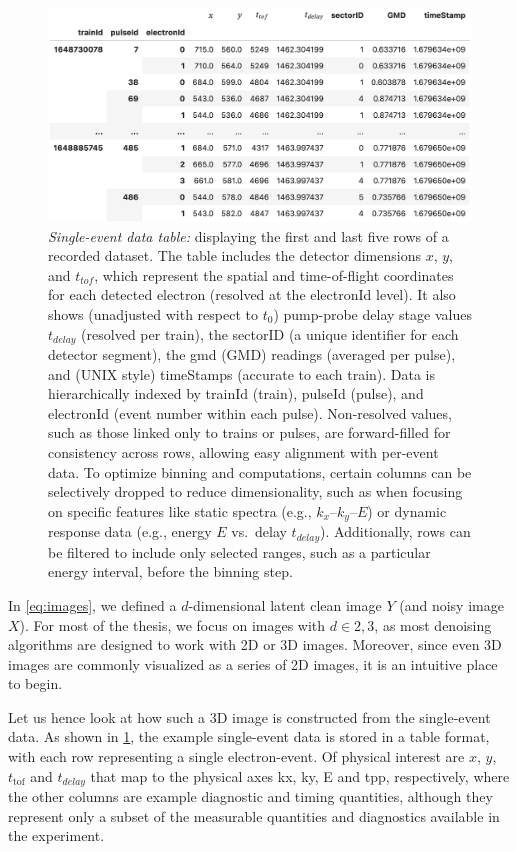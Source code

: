 \begin{figure}
    \centering
    \includegraphics[width=1\linewidth]{images/dataframe.png}
    \caption{\textit{Single-event data table:} displaying the first and last five rows of a recorded dataset. The table includes the detector dimensions $x$, $y$, and $t_{tof}$, which represent the spatial and time-of-flight coordinates for each detected electron (resolved at the electronId level). It also shows (unadjusted with respect to $t_0$) pump-probe delay stage values $t_{delay}$ (resolved per train), the sectorID (a unique identifier for each detector segment), the \gls{gmd} (GMD) readings (averaged per pulse), and (UNIX style) timeStamps (accurate to each train). Data is hierarchically indexed by trainId (\gls{train}), pulseId (\gls{pulse}), and electronId (event number within each pulse). Non-resolved values, such as those linked only to trains or pulses, are forward-filled for consistency across rows, allowing easy alignment with per-event data. To optimize binning and computations, certain columns can be selectively dropped to reduce dimensionality, such as when focusing on specific features like static spectra (e.g., $k_x$–$k_y$–$E$) or dynamic response data (e.g., energy $E$ vs.\ delay $t_{delay}$). Additionally, rows can be filtered to include only selected ranges, such as a particular energy interval, before the binning step.}
    \label{fig:df}
\end{figure}

In \cref{eq:images}, we defined a $d$-dimensional latent clean image $Y$ (and noisy image $X$). For most of the thesis, we focus on images with $d \in {2,3}$, as most denoising algorithms are designed to work with 2D or 3D images. Moreover, since even 3D images are commonly visualized as a series of 2D images, it is an intuitive place to begin. 

Let us hence look at how such a 3D image is constructed from the single-event data. As shown in \cref{fig:df}, the example single-event data is stored in a table format, with each row representing a single electron-event. Of physical interest are $x$, $y$, $t_{\text{tof}}$ and $t_{delay}$ that map to the physical axes \gls{kx}, \gls{ky}, \gls{E} and \gls{tpp}, respectively, where the other columns are example diagnostic and timing quantities, although they represent only a subset of the measurable quantities and diagnostics available in the experiment.

